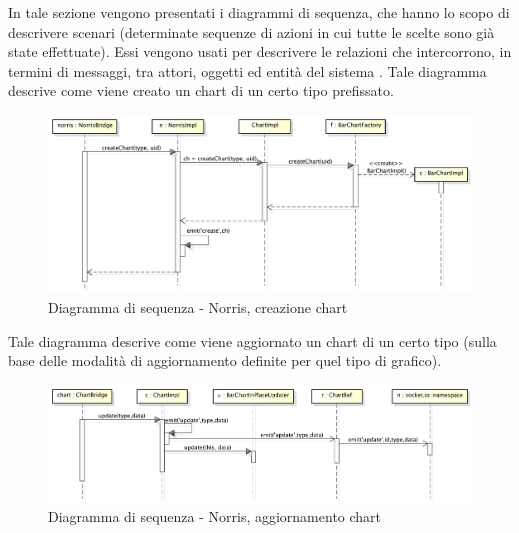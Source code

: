     	In tale sezione vengono presentati i diagrammi di sequenza, che hanno lo scopo di descrivere scenari (determinate sequenze di azioni in cui tutte le scelte sono già state effettuate). Essi vengono usati per descrivere le relazioni che intercorrono, in termini di messaggi, tra attori, oggetti ed entità del sistema .
        	Tale diagramma descrive come viene creato un chart di un certo tipo prefissato.
            \begin{figure}[H]
                \centering
                \includegraphics[scale=0.3]{DefinizioneDiProdotto/Pics/NorrisCreazioneChart}
                \caption{Diagramma di sequenza - Norris, creazione chart}
            \end{figure}


        	Tale diagramma descrive come viene aggiornato un chart di un certo tipo (sulla base delle modalità di aggiornamento definite per quel tipo di grafico).
            \begin{figure}[H]
                \centering
                \includegraphics[scale=0.3]{DefinizioneDiProdotto/Pics/NorrisAggiornamentoChart}
                \caption{Diagramma di sequenza - Norris, aggiornamento chart}
            \end{figure}

